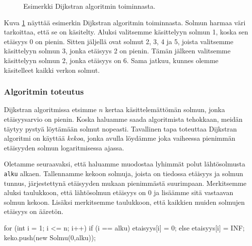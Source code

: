 \begin{figure}
\begin{center}
\end{center}
\caption{Esimerkki Dijkstran algoritmin toiminnasta.}
\label{fig:dijalg}
\end{figure}

Kuva \ref{fig:dijalg} näyttää esimerkin Dijkstran algoritmin
toiminnasta.
Solmun harmaa väri tarkoittaa, että se on käsitelty.
Aluksi valitsemme käsittelyyn solmun 1, koska sen etäisyys 0 on pienin.
Sitten jäljellä ovat solmut 2, 3, 4 ja 5,
joista valitsemme käsittelyyn solmun 3, jonka etäisyys 2 on pienin.
Tämän jälkeen valitsemme käsittelyyn solmun 2,
jonka etäisyys on 6.
Sama jatkuu, kunnes olemme käsitelleet kaikki verkon solmut.

\subsubsection{Algoritmin toteutus}

Dijkstran algoritmissa etsimme $n$ kertaa
käsittelemättömän solmun, jonka etäisyysarvio on pienin.
Koska haluamme saada algoritmista tehokkaan,
meidän täytyy pystyä löytämään solmut nopeasti.
Tavallinen tapa toteuttaa Dijkstran algoritmi on käyttää \emph{kekoa},
jonka avulla löydämme joka vaiheessa pienimmän etäisyyden solmun
logaritmisessa ajassa.

Oletamme seuraavaksi, että haluamme muodostaa lyhimmät
polut lähtö\-solmusta \texttt{alku} alkaen.
Tallennamme kekoon solmuja, joista on tiedossa
etäi\-syys ja solmun tunnus,
järjestettynä etäisyyden mukaan pienimmästä suurimpaan.
Merkitsemme aluksi taulukkoon, että lähtösolmun etäisyys on $0$
ja lisäämme sitä vastaavan solmun kekoon.
Lisäksi merkitsemme taulukkoon, että kaikkien muiden
solmujen etäisyys on ääretön.

\begin{code}
for (int i = 1; i <= n; i++) {
    if (i == alku) etaisyys[i] = 0;
    else etaisyys[i] = INF;
}
keko.push(new Solmu(0,alku));
\end{code}


